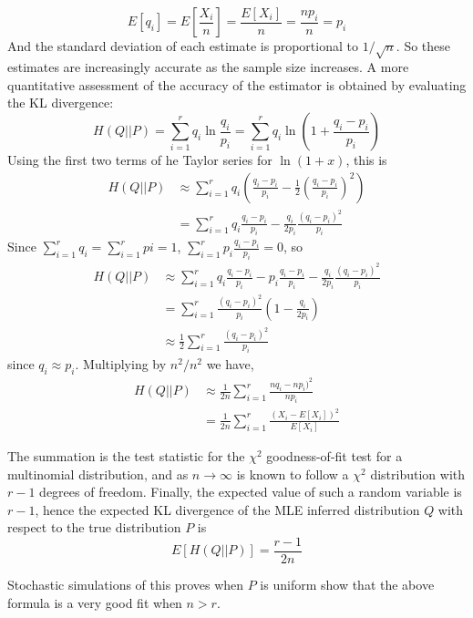 \documentclass[letterpaper]{article}
\begin{document}
$$E[q_i] = E\left[\frac{X_i}{n}\right] = \frac{E[X_i]}{n} = \frac{np_i}{n} =
p_i$$
And the standard deviation of each estimate is proportional to $1/\sqrt{n}$. So
these estimates are increasingly accurate as the sample size increases. A more
quantitative assessment of the accuracy of the estimator is obtained by
evaluating the KL divergence:
$$H(Q||P)
= \sum_{i = 1}^{r} q_i \ln \frac{q_i}{p_i}
= \sum_{i = 1}^{r} q_i \ln \left(1 + \frac{q_i - p_i}{p_i} \right) $$
Using the first two terms of he Taylor series for $\ln (1 + x)$, this is
\begin{align*}
H(Q||P) &\approx \sum_{i = 1}^{r} q_i \left( \frac{q_i - p_i}{p_i} -
\frac{1}{2} \left( \frac{q_i - p_i}{p_i} \right)^2 \right ) \\
&= \sum_{i = 1}^{r} q_i \frac{q_i - p_i}{p_i} -
\frac{q_i}{2 p_i} \frac{(q_i - p_i)^2} {p_i}
\end{align*}
Since $\sum_{i = 1}^{r} q_i = \sum_{i = 1}^{r} pi = 1$,
$\sum_{i = 1}^{r} p_i \frac{q_i - p_i}{p_i} = 0$, so
\begin{align*}
H(Q||P) &\approx \sum_{i=1}^{r} q_i \frac{q_i - p_i}{p_i} - p_i \frac{q_i -
p_i}{p_i} - \frac{q_i}{2 p_i} \frac{(q_i - p_i)^2}{p_i} \\
&= \sum_{i=1}^{r} \frac{(q_i - p_i)^2}{p_i}\left(1 - \frac{q_i}{2 p_i}\right) \\
&\approx \frac{1}{2} \sum_{i=1}^{r} \frac{(q_i - p_i)^2}{p_i}
\end{align*}
since $q_i \approx p_i$. Multiplying by $n^2 / n^2$ we have,
\begin{align*}
H(Q||P) &\approx \frac{1}{2n} \sum_{i=1}^{r} \frac{n q_i - n p_i)^2}{n p_i} \\
        &= \frac{1}{2n} \sum_{i=1}^{r} \frac{(X_i - E[X_i])^2}{E[X_i]}
\end{align*}

The summation is the test statistic for the $\chi^2$ goodness-of-fit test for a
multinomial distribution, and as $n \rightarrow \infty$ is known to follow a
$\chi^2$ distribution with $r - 1$ degrees of freedom. Finally, the expected
value of such a random variable is $r - 1$, hence the expected KL divergence of
the MLE inferred distribution $Q$ with respect to the true distribution $P$ is
$$E[H(Q||P)] = \frac{r - 1}{2n}$$

Stochastic simulations of this proves when $P$ is uniform show that the above
formula is a very good fit when $n > r$.



\end{document}
